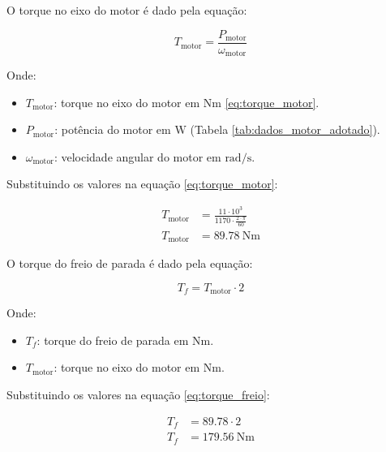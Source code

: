 O torque no eixo do motor é dado pela equação:

\begin{equation}
  T_{\text{motor}} = \frac{P_{\text{motor}}}{\omega_{\text{motor}}}
  \label{eq:torque_motor}
\end{equation}

Onde:

\begin{itemize}[leftmargin=1.25cm]
  \item $T_{\text{motor}}$: torque no eixo do motor em $\si{\newton\meter}$ \eqref{eq:torque_motor}.
  \item $P_{\text{motor}}$: potência do motor em $\si{\watt}$ (Tabela \ref{tab:dados_motor_adotado}).
  \item $\omega_{\text{motor}}$: velocidade angular do motor em $\si{\radian\per\second}$.
\end{itemize}

\vspace{1em}

Substituindo os valores na equação \eqref{eq:torque_motor}:

\begin{align*}
  T_{\text{motor}} & = \frac{11 \cdot 10^3}{1170 \cdot \frac{2 \cdot \pi}{60}} \\
  T_{\text{motor}} & = \boxed{\SI{89.78}{\newton\meter}}
\end{align*}

O torque do freio de parada é dado pela equação:

\begin{equation}
  T_f = T_{\text{motor}} \cdot 2
  \label{eq:torque_freio}
\end{equation}

Onde:

\begin{itemize}[leftmargin=1.25cm]
  \item $T_f$: torque do freio de parada em $\si{\newton\meter}$.
  \item $T_{\text{motor}}$: torque no eixo do motor em $\si{\newton\meter}$.
\end{itemize}

\vspace{1em}

Substituindo os valores na equação \eqref{eq:torque_freio}:

\begin{align*}
  T_f & = \num{89.78} \cdot 2                      \\
  T_f & = \boxed{\SI{179.56}{\newton\meter}}
\end{align*}

